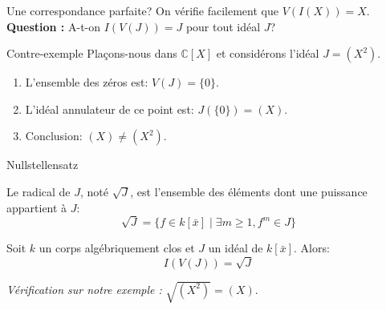 \documentclass{beamer}
\begin{document}
% 
\begin{frame}{Une correspondance parfaite?}
    On vérifie facilement que $V(I(X)) = X$. \\
    \vspace{0.5cm}
    \textbf{Question :} A-t-on $I(V(J)) = J$ pour tout idéal $J$?

    \pause
    \begin{alertblock}{Contre-exemple}
        Plaçons-nous dans $\mathbb{C}[X]$ et considérons l'idéal $J = (X^2)$.
        \pause
        \begin{enumerate}
            \item L'ensemble des zéros est: $V(J) = \{ 0 \}$. \pause
            \item L'idéal annulateur de ce point est: $J(\{0\}) = (X)$. \pause
            \item Conclusion: $(X) \neq (X^2)$.
        \end{enumerate}
    \end{alertblock}
\end{frame}

\begin{frame}{Nullstellensatz}
    \begin{definition}
        Le radical de $J$, noté $\sqrt{J}$, est l'ensemble des éléments dont une puissance appartient à $J$:
        \[ \sqrt{J} = \{ f \in k[\bar{x}] \mid \exists m \ge 1, f^m \in J \} \]
    \end{definition}

    \pause
    \begin{theorem}
        Soit $k$ un corps algébriquement clos et $J$ un idéal de $k[\bar{x}]$. Alors:
        \[ I(V(J)) = \sqrt{J} \]
    \end{theorem}
    \pause
    \textit{Vérification sur notre exemple :} $\sqrt{(X^2)} = (X)$.
\end{frame}
\end{document}
